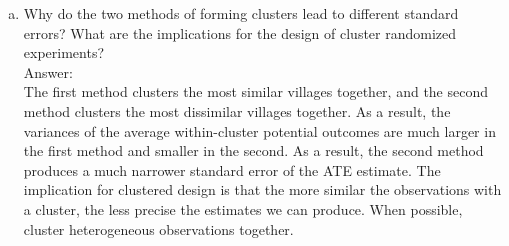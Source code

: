 \documentclass[11pt,notitlepage]{article}\usepackage[]{graphicx}\usepackage[]{color}
\makeatletter
\newenvironment{kframe}{%
 \def\at@end@of@kframe{}%
 \ifinner\ifhmode%
  \def\at@end@of@kframe{\end{minipage}}%
  \begin{minipage}{\columnwidth}%
 \fi\fi%
 \def\FrameCommand##1{\hskip\@totalleftmargin \hskip-\fboxsep
 \colorbox{shadecolor}{##1}\hskip-\fboxsep
     \hskip-\linewidth \hskip-\@totalleftmargin \hskip\columnwidth}%
 \MakeFramed {\advance\hsize-\width
   \@totalleftmargin\z@ \linewidth\hsize
   \@setminipage}}%
 {\par\unskip\endMakeFramed%
 \at@end@of@kframe}
\newenvironment{knitrout}{}{} %
\makeatother
\begin{document}
\begin{enumerate}[a)]
\begin{knitrout}
\begin{kframe}
\begin{Verbatim}[commandchars=\\\{\}]
         \PY{c+c1}{//}\PY{c+c1}{ }\PY{c+c1}{c}\PY{c+c1}{o}\PY{c+c1}{v}\PY{c+c1}{\PYZus{}}\PY{c+c1}{Y}\PY{c+c1}{b}\PY{c+c1}{a}\PY{c+c1}{r}\PY{c+c1}{0}\PY{c+c1}{ }\PY{c+c1}{\PYZlt{}}\PY{c+c1}{\PYZhy{}}\PY{c+c1}{ }\PY{c+c1}{c}\PY{c+c1}{o}\PY{c+c1}{v}\PY{c+c1}{.}\PY{c+c1}{p}\PY{c+c1}{o}\PY{c+c1}{p}\PY{c+c1}{(}\PY{c+c1}{Y}\PY{c+c1}{b}\PY{c+c1}{a}\PY{c+c1}{r}\PY{c+c1}{0}\PY{c+c1}{,}\PY{c+c1}{Y}\PY{c+c1}{b}\PY{c+c1}{a}\PY{c+c1}{r}\PY{c+c1}{1}\PY{c+c1}{)}
         cor\PYZus{}pop Ybar0 Ybar1
         \PY{k}{scalar} cov\PYZus{}Ybar0=\PY{n+nf}{r}(cor\PYZus{}pop)
         
         \PY{c+c1}{//}\PY{c+c1}{ }\PY{c+c1}{s}\PY{c+c1}{e}\PY{c+c1}{\PYZus{}}\PY{c+c1}{a}\PY{c+c1}{t}\PY{c+c1}{e}
         \PY{k}{scalar} se\PYZus{}ate = \PY{n+nf}{sqrt}((\PY{l+m}{1}\PY{o}{/}\PY{l+m}{6})\PY{o}{*}((\PY{l+m}{4}\PY{o}{/}\PY{l+m}{3})\PY{o}{*}var\PYZus{}Ybar0\PY{o}{+}(\PY{l+m}{3}\PY{o}{/}\PY{l+m}{4})\PY{o}{*}var\PYZus{}Ybar1\PY{l+m}{+2}\PY{o}{*}cov\PYZus{}Ybar0))
         \PY{k}{di} \PY{l+s}{\PYZdq{}}\PY{l+s}{s}\PY{l+s}{e}\PY{l+s}{\PYZus{}}\PY{l+s}{a}\PY{l+s}{t}\PY{l+s}{e}\PY{l+s}{ }\PY{l+s}{=}\PY{l+s}{\PYZdq{}}\PY{n+nFormat}{\PYZpc{}8.7f} se\PYZus{}ate
         
         \PY{k}{restore}
\end{Verbatim}

    \begin{Verbatim}[commandchars=\\\{\}]
se\_ate =0.9766259
    \end{Verbatim}
\end{kframe}
\end{knitrout}

Assuming that 4 out of 7 clusters are assigned to treatment, the standard error of the ATE will be 0.98.

\item Why do the two methods of forming clusters lead to different standard errors? What are the implications for the design of cluster randomized experiments?\\
Answer:\\
The first method clusters the most similar villages together, and the second method clusters the most dissimilar villages together. As a result, the variances of the average within-cluster potential outcomes are much larger in the first method and smaller in the second. As a result, the second method produces a much narrower standard error of the ATE estimate. The implication for clustered design is that the more similar the observations with a cluster, the less precise the estimates we can produce. When possible, cluster heterogeneous observations together.
\end{enumerate}
\end{document}
